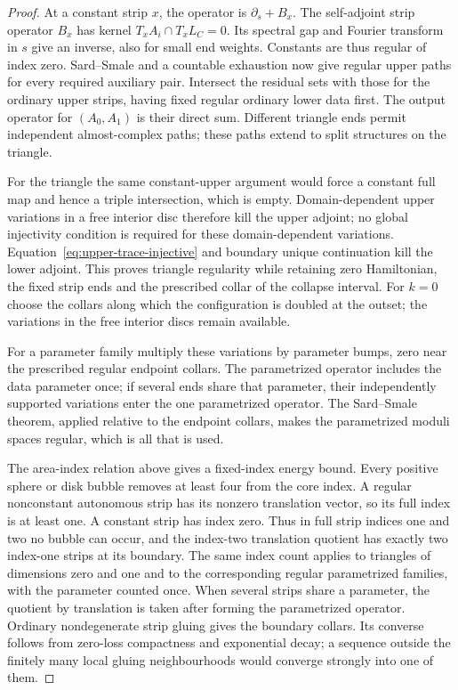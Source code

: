 \documentclass[11pt]{amsart}
\theoremstyle{definition}
\theoremstyle{remark}
\theoremstyle{plain}
\numberwithin{equation}{section}
\begin{document}
\begin{proof}
At a constant strip $x$, the operator is $\partial_s+B_x$.
The self-adjoint strip operator $B_x$ has kernel
$T_xA_i\cap T_xL_C=0$. Its spectral gap and Fourier transform
in $s$ give an inverse, also for small end weights. Constants
are thus regular of index zero. Sard--Smale and a countable
exhaustion now give regular upper paths for every required
auxiliary pair. Intersect the residual sets with those for the
ordinary upper strips, having fixed regular ordinary lower data first.
The output operator for $(A_0,A_1)$ is their direct sum.
Different triangle ends permit independent almost-complex paths;
these paths extend to split structures on the triangle.

For the triangle the same constant-upper argument would force
a constant full map and hence a triple intersection, which is
empty. Domain-dependent upper variations in a free interior
disc therefore kill the upper adjoint; no global injectivity
condition is required for these domain-dependent variations.
Equation~\eqref{eq:upper-trace-injective} and boundary unique
continuation kill the lower adjoint. This proves triangle
regularity while retaining zero Hamiltonian, the fixed strip
ends and the prescribed collar of the collapse interval. For
$k=0$ choose the collars along which the configuration is doubled at the outset; the
variations in the free interior discs remain available.

For a parameter family multiply these variations by parameter bumps, zero near the
prescribed regular endpoint collars. The parametrized operator includes the data parameter
once; if several ends share that parameter, their independently supported variations enter
the one parametrized operator. The Sard--Smale theorem, applied relative to the endpoint
collars, makes the parametrized moduli spaces regular, which is all that is used.

The area-index relation above gives a fixed-index energy bound.
Every positive sphere or disk bubble removes at least four
from the core index. A regular nonconstant autonomous strip
has its nonzero translation vector, so its full index is at
least one. A constant strip has index zero. Thus in full strip
indices one and two no bubble can occur, and the index-two
translation quotient has exactly two index-one strips at its
boundary. The same index count applies to triangles of dimensions zero and one and to
the corresponding regular parametrized families, with the parameter counted once. When
several strips share a parameter, the quotient by translation is taken after forming the
parametrized operator. Ordinary
nondegenerate strip gluing gives the boundary collars. Its
converse follows from zero-loss compactness and exponential
decay; a sequence outside the finitely many local gluing
neighbourhoods would converge strongly into one of them.


\end{proof}
\end{document}
